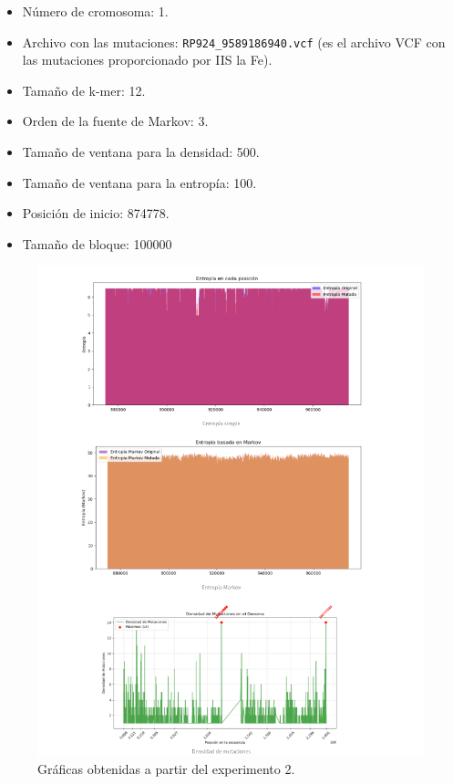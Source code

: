 \documentclass[11pt,spanish,listoffigures,listoftables]{tfgetsinf}
\begin{document}
\begin{itemize}
   \item Número de cromosoma: 1.
   \item Archivo con las mutaciones: \texttt{RP924\_9589186940.vcf}  (es el archivo \ac{VCF} con las mutaciones proporcionado por \ac{IIS} la Fe).
   \item Tamaño de k-mer: 12.
   \item Orden de la fuente de Markov: 3.
   \item Tamaño de ventana para la densidad: 500.
   \item Tamaño de ventana para la entropía: 100.
   \item Posición de inicio: 874778.
   \item Tamaño de bloque: 100000 
\end{itemize}

\begin{figure}[H]
      \centering
      \includegraphics[width=1.0\textwidth]{graf_exp2.png}
      \caption{Gráficas obtenidas a partir del experimento 2.}
      \label{fig:etiqueta_opcional17}
\end{figure}
\end{document}

